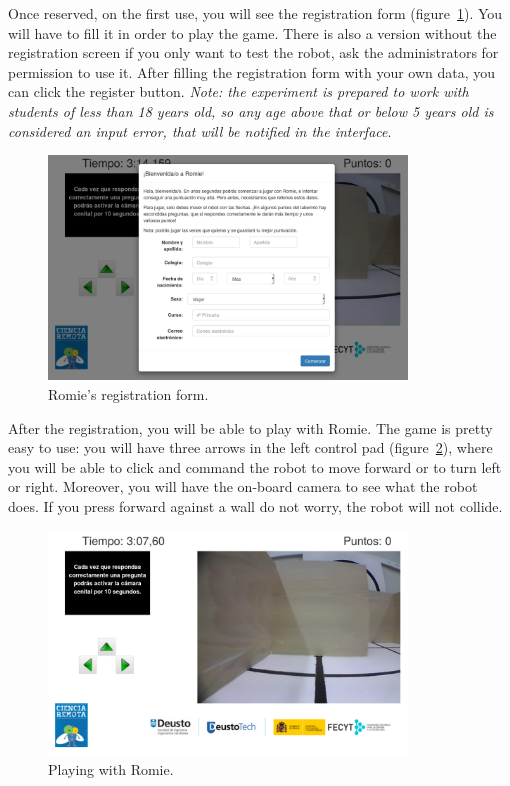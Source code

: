 Once reserved, on the first use, you will see the registration form
(figure~\ref{fig:man:romie_register}). You will have to fill it in order to play the game. There is
also a version without the registration screen if you only want to test the robot, ask the
administrators for permission to use it. After filling the registration form  with your own data,
you can click the register button. \emph{Note: the experiment is prepared to work with students of
less than 18 years old, so any age above that or below 5 years old is considered an input error,
that will be notified in the interface}.

\begin{figure}[!htbp]
	\centering
	\includegraphics[width=0.85\textwidth]{fig/manuals/trivial/romie-register}
	\caption{Romie's registration form.}
	\label{fig:man:romie_register}
\end{figure}

After the registration, you will be able to play with Romie. The game is pretty easy to use: you
will have three arrows in the left control pad (figure~\ref{fig:man:romie_start}), where you will be
able to click and command the robot to move forward or to turn left or right. Moreover, you will
have the on-board camera to see what the robot does. If you press forward against a wall do not
worry, the robot will not collide.

\begin{figure}[!htbp]
	\centering
	\includegraphics[width=0.85\textwidth]{fig/manuals/trivial/romie-start}
	\caption{Playing with Romie.}
	\label{fig:man:romie_start}
\end{figure}


